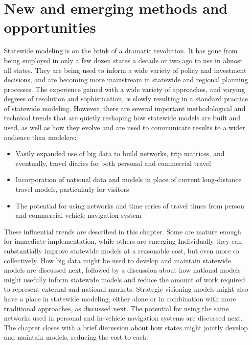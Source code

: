 \chapter{New and emerging methods and opportunities}\label{sec:emerging-methods-opportunities}

Statewide modeling is on the brink of a dramatic revolution. It has gone from being employed in only a few dozen states a decade or two ago to use in almost all states. They are being used to inform a wide variety of policy and investment decisions, and are becoming more mainstream in statewide and regional planning processes. The experience gained with a wide variety of approaches, and varying degrees of resolution and sophistication, is slowly resulting in a standard practice of statewide modeling. However, there are several important methodological and technical trends that are quietly reshaping how statewide models are built and used, as well as how they evolve and are used to communicate results to a wider audience than modelers:

\begin{itemize}
\item Vastly expanded use of big data to build networks, trip matrices, and eventually, travel diaries for both personal and commercial travel
\item Incorporation of national data and models in place of current long-distance travel models, particularly for visitors
\item The potential for using networks and time series of travel times from person and commercial vehicle navigation system
\end{itemize}

These influential trends are described in this chapter. Some are mature enough for immediate implementation, while others are emerging Individually they can substantially improve statewide models at a reasonable cost, but even more so collectively. How big data might be used to develop and maintain statewide models are discussed next, followed by a discussion about how national models might usefully inform statewide models and reduce the amount of work required to represent external and national markets. Strategic visioning models might also have a place in statewide modeling, either alone or in combination with more traditional approaches, as discussed next. The potential for using the same networks used in personal and in-vehicle navigation systems are discussed next. The chapter closes with a brief discussion about how states might jointly develop and maintain models, reducing the cost to each.

